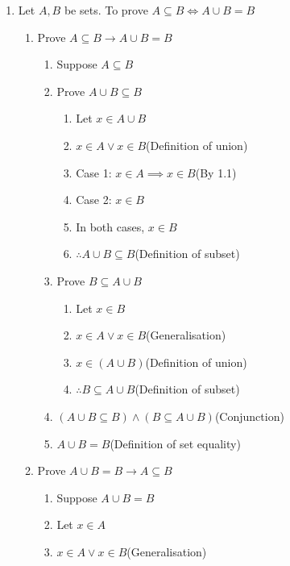 \documentclass[12pt, a4paper]{article}
\begin{document}
\begin{enumerate}[Q\arabic*.]
  \pagebreak
  \item Let $A, B$ be sets. To prove $A \subseteq B \iff A \cup B = B$
    \begin{enumerate}[\arabic*.]
      \item Prove $A \subseteq B \rightarrow A \cup B = B$
        \begin{enumerate}[label=1.\arabic*]
          \item Suppose $A \subseteq B$
          \item Prove $A \cup B \subseteq B$
            \begin{enumerate}[label=1.2.\arabic*]
              \item Let $x \in A \cup B$
              \item $x \in A \lor x \in B$\hfill(Definition of union)
              \item Case 1: $x \in A \implies x \in B$\hfill(By 1.1)
              \item Case 2: $x \in B$
              \item In both cases, $x \in B$
              \item $\therefore A \cup B \subseteq B$\hfill(Definition of subset)
            \end{enumerate}
          \item Prove $B \subseteq A \cup B$
            \begin{enumerate}[label=1.3.\arabic*]
              \item Let $x \in B$
              \item $x \in A \lor x \in B$\hfill(Generalisation)
              \item $x \in (A \cup B)$\hfill(Definition of union)
              \item $\therefore B \subseteq A \cup B$\hfill(Definition of subset)
            \end{enumerate}
          \item $(A \cup B \subseteq B) \land (B \subseteq A \cup B)$\hfill(Conjunction)
          \item $A \cup B = B$\hfill(Definition of set equality)
        \end{enumerate}
      \item Prove $A \cup B = B \rightarrow A \subseteq B$
        \begin{enumerate}[label=2.\arabic*]
          \item Suppose $A \cup B = B$ 
          \item Let $x \in A$
          \item $x\in A \lor x \in B$\hfill(Generalisation)

\end{enumerate}
\end{enumerate}
\end{enumerate}
\end{document}
